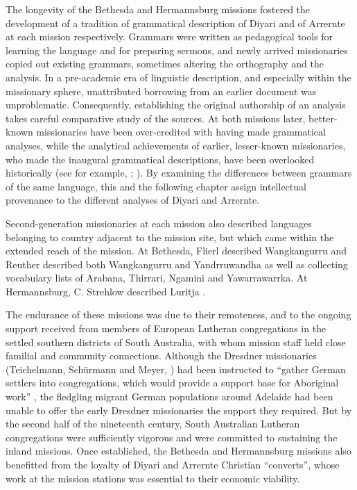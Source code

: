 The longevity of the Bethesda and Hermannsburg missions fostered the development of a tradition of grammatical description of Diyari and of Arrernte at each mission respectively. Grammars were written as pedagogical tools for learning the language and for preparing sermons, and newly arrived missionaries copied out existing grammars, sometimes altering the orthography and the analysis. In a pre-academic era of linguistic description, and especially within the missionary sphere, unattributed borrowing from an earlier document was unproblematic. Consequently, establishing the original authorship of an analysis takes careful comparative study of the sources. At both missions later, better-known missionaries have been over-credited with having made grammatical analyses, while the analytical achievements of earlier, lesser-known missionaries, who made the inaugural grammatical descriptions, have been overlooked historically (see for example, \citealt[87]{kenny_arandas_2013}; \citealt[527]{hill_broken_2002}). By examining the differences between grammars of the same language, this and the following chapter assign intellectual provenance to the different analyses of Diyari and Arrernte.

Second-generation missionaries at each mission also described languages belonging to country adjacent to the mission site, but which came within the extended reach of the mission. At Bethesda, Flierl described Wangkangurru \citeyearpar{flierl_dieri_1880} and Reuther described both Wangkangurru \citeyearpar{reuther_ms_1901} and Yandrruwandha \citeyearpar{reuther_ms_1901} as well as collecting vocabulary lists of Arabana, Thirrari, Ngamini and Yawarrawarrka. At Hermannsburg, C. Strehlow described Luritja \citeyearpar{strehlow_notitle_1910}.

The endurance of these missions was due to their remoteness, and to the ongoing support received from members of European Lutheran congregations in the settled southern districts of South Australia, with whom mission staff held close familial and community connections. Although the Dresdner missionaries (Teichelmann, Schürmann and Meyer, ) had been instructed to “gather German settlers into congregations, which would provide a support base for Aboriginal work” \citep[9]{lockwood_vision_2007}, the fledgling migrant German populations around Adelaide had been unable to offer the early Dresdner missionaries the support they required. But by the second half of the nineteenth century, South Australian Lutheran congregations were sufficiently vigorous and were committed to sustaining the inland missions. Once established, the Bethesda and Hermannsburg missions also benefitted from the loyalty of Diyari and Arrernte Christian ``converts'', whose work at the mission stations was essential to their economic viability.


